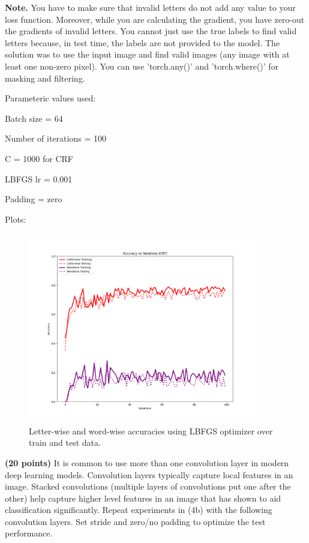 \documentclass[11pt]{report}
\begin{document}
\begin{itemize}
{\bf Note.} You have to make sure that invalid letters do not add any value to your loss function. Moreover, while you are calculating the gradient, you have zero-out the gradients of invalid letters. You cannot just use the true labels to find valid letters because, in test time, the labels are not provided to the model. The solution was to use the input image and find valid images (any image with at least one non-zero pixel). You can use 'torch.any()' and 'torch.where()' for masking and filtering.

  
\item[\textbf{ [Answer] } ]{
Parameteric values used: 

Batch size = 64

Number of iterations = 100

C = 1000 for CRF

LBFGS lr = 0.001

Padding = zero

 
\item[\textbf{[Answer]} ]{
Plots:
            \begin{figure}[H]
            	\centering
            	\includegraphics[width=10cm]{latex/accuracies_4b.png}
                \caption{Letter-wise and word-wise accuracies using LBFGS optimizer over train and test data. }
            	\label{fig:compare_optimizer}
            \end{figure}
            }
 

}

\item [(4c)] {\bf (20 points)} It is common to use more than one convolution
  layer in modern deep learning models. Convolution layers typically capture
  local features in an image. Stacked convolutions (multiple layers of
  convolutions put one after the other) help capture higher level features in an
  image that has shown to aid classification significantly. Repeat experiments
  in (4b) with the following convolution layers. Set stride and zero/no padding
  to optimize the test performance.



\end{itemize}
\end{document}
